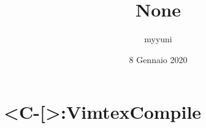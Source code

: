 \documentclass[12pt, a4paper]{article}
\date{8 Gennaio 2020}
\title{None}
\author{myyuni}
\begin{document}
\maketitle

\section{<C-[>:VimtexCompile}
\end{document}
